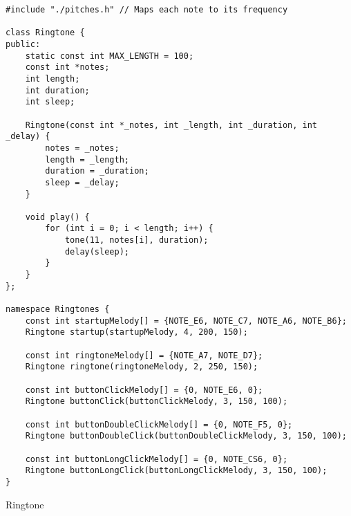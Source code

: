 \begin{code}
\begin{verbatim}
#include "./pitches.h" // Maps each note to its frequency

class Ringtone {
public:
    static const int MAX_LENGTH = 100;
    const int *notes;
    int length;
    int duration;
    int sleep;

    Ringtone(const int *_notes, int _length, int _duration, int _delay) {
        notes = _notes;
        length = _length;
        duration = _duration;
        sleep = _delay;
    }

    void play() {
        for (int i = 0; i < length; i++) {
            tone(11, notes[i], duration);
            delay(sleep);
        }
    }
};

namespace Ringtones {
    const int startupMelody[] = {NOTE_E6, NOTE_C7, NOTE_A6, NOTE_B6};
    Ringtone startup(startupMelody, 4, 200, 150);

    const int ringtoneMelody[] = {NOTE_A7, NOTE_D7};
    Ringtone ringtone(ringtoneMelody, 2, 250, 150);

    const int buttonClickMelody[] = {0, NOTE_E6, 0};
    Ringtone buttonClick(buttonClickMelody, 3, 150, 100);

    const int buttonDoubleClickMelody[] = {0, NOTE_F5, 0};
    Ringtone buttonDoubleClick(buttonDoubleClickMelody, 3, 150, 100);

    const int buttonLongClickMelody[] = {0, NOTE_CS6, 0};
    Ringtone buttonLongClick(buttonLongClickMelody, 3, 150, 100);
}
\end{verbatim}
\caption{Ringtone}
\end{code}